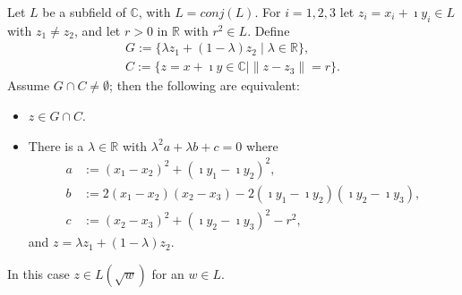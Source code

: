 \begin{frame}
    
    \begin{lemma}[2]
        \label{lem:ConjClosed.Intersection_line_circle}
        \leanok
        Let $L$ be a subfield of $\mathbb{C}$, with $L = conj(L)$. For $i = 1,2,3$ let $z_i = x_i + \imath y_i \in L$ with $z_1 \ne z_2$, and let $r > 0$ in $\mathbb{R}$ with $r^2 \in L$. Define
        \begin{equation*}\begin{aligned}
            G := \{\lambda z_1 + (1-\lambda)z_2 \mid \lambda \in \mathbb{R}\},\\
            C := \{z = x + \imath y \in \mathbb{C} \mid \|z - z_3\| = r\}.
        \end{aligned} \end{equation*}
        Assume $G \cap C \ne \emptyset$; then the following are equivalent:
        \begin{itemize}
            \item $z\in G \cap C$.
            \item There is a $\lambda \in \mathbb{R}$ with $\lambda^2 a+ \lambda b + c = 0$ where
            \begin{align*}
                a &:= (x_1 - x_2)^2 + (\imath y_1 - \imath y_2)^2,\\
                b &:= 2(x_1 - x_2)(x_2 - x_3) - 2(\imath y_1 - \imath y_2)(\imath y_2 - \imath y_3),\\
                c &:= (x_2 - x_3)^2 + (\imath y_2 - \imath y_3)^2 - r^2,
            \end{align*}
            and $z = \lambda z_1 + (1-\lambda)z_2$.
        \end{itemize}
        In this case $z \in L(\sqrt{w})$ for an $w \in L$.
    \end{lemma}
\end{frame}

